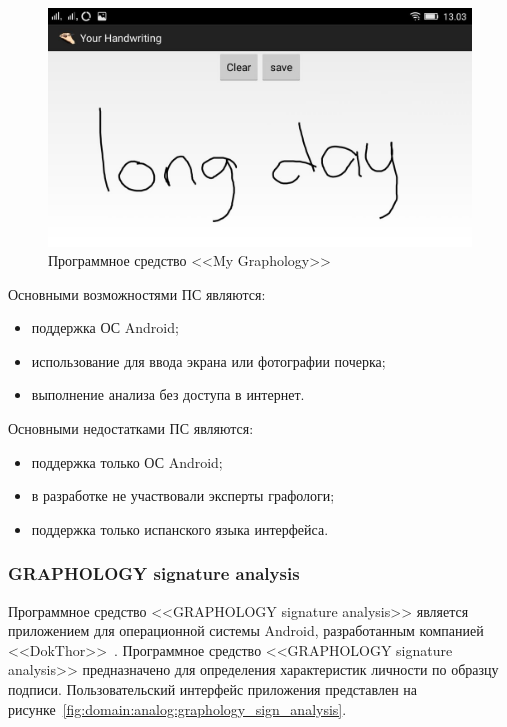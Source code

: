 \begin{figure}[h]
    \centering
    \includegraphics[width=0.4\textheight]{figures/analog_my_graphology.jpeg}
    \caption{Программное средство <<My Graphology>>}
    \label{fig:domain:analogs:my_graphology}
\end{figure}

Основными возможностями ПС являются:
\begin{itemize}
  \item поддержка ОС Android;
  \item использование для ввода экрана или фотографии почерка;
  \item выполнение анализа без доступа в интернет.
\end{itemize}

Основными недостатками ПС являются:
\begin{itemize}
  \item поддержка только ОС Android;
  \item в разработке не участвовали эксперты графологи;
  \item поддержка только испанского языка интерфейса.
\end{itemize}

\subsubsection{GRAPHOLOGY signature analysis}
\label{sub:domain:analogs:graphology_sign_analysis}
Программное средство <<GRAPHOLOGY signature analysis>> является приложением для операционной системы Android, разработанным компанией <<DokThor>>~\cite{analogs_graphology_sign_analysis}. Программное средство <<GRAPHOLOGY signature analysis>> предназначено для определения характеристик личности по образцу подписи. Пользовательский интерфейс приложения представлен на рисунке~\ref{fig:domain:analog:graphology_sign_analysis}.

